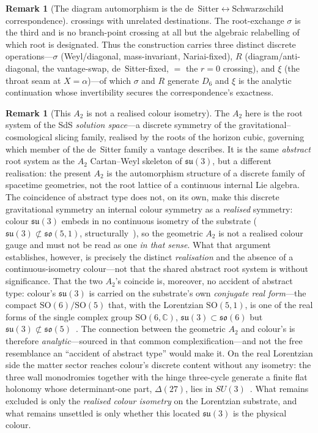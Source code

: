 \documentclass[11pt,a4paper]{article}
\theoremstyle{definition}
\newtheorem{remark}[theorem]{Remark}
\begin{document}
\begin{remark}[The diagram automorphism is the de~Sitter$\leftrightarrow$Schwarzschild correspondence]
crossings with unrelated destinations. The root-exchange $\sigma$ is the third and is no branch-point crossing at all but the algebraic relabelling of which root is designated. Thus the construction carries three distinct discrete operations---$\sigma$ (Weyl/diagonal, mass-invariant, Nariai-fixed), $R$ (diagram/anti-diagonal, the vantage-swap, de~Sitter-fixed, $=$ the $r=0$ crossing), and $\xi$ (the throat seam at $X=\alpha$)---of which $\sigma$ and $R$ generate $D_{6}$ and $\xi$ is the analytic continuation whose invertibility secures the correspondence's exactness.
\end{remark}

\begin{remark}[This $A_{2}$ is not a realised colour isometry]\label{rem:a2-distinct}
The $A_{2}$ here is the root system of the SdS \emph{solution space}---a discrete symmetry of the gravitational--cosmological slicing family, realised by the roots of the horizon cubic, governing which member of the de~Sitter family a vantage describes. It is the same \emph{abstract} root system as the $A_{2}$ Cartan--Weyl skeleton of $\mathfrak{su}(3)$, but a different realisation: the present $A_{2}$ is the automorphism structure of a discrete family of spacetime geometries, not the root lattice of a continuous internal Lie algebra. The coincidence of abstract type does not, on its own, make this discrete gravitational symmetry an internal colour symmetry as a \emph{realised} symmetry: colour $\mathfrak{su}(3)$ embeds in no continuous isometry of the substrate ($\mathfrak{su}(3)\not\subset\mathfrak{so}(5,1)$, structurally~\cite{JanzenBoundary}), so the geometric $A_{2}$ is not a realised colour gauge and must not be read as one \emph{in that sense}. What that argument establishes, however, is precisely the distinct \emph{realisation} and the absence of a continuous-isometry colour---not that the shared abstract root system is without significance. That the two $A_{2}$'s coincide is, moreover, no accident of abstract type: colour's $\mathfrak{su}(3)$ is carried on the substrate's own \emph{conjugate real form}---the compact $\mathrm{SO}(6)/\mathrm{SO}(5)$ that, with the Lorentzian $\mathrm{SO}(5,1)$, is one of the real forms of the single complex group $\mathrm{SO}(6,\mathbb{C})$, $\mathfrak{su}(3)\subset\mathfrak{so}(6)$ but $\mathfrak{su}(3)\not\subset\mathfrak{so}(5)$~\cite{JanzenBoundary,JanzenGeometricCore}. The connection between the geometric $A_{2}$ and colour's is therefore \emph{analytic}---sourced in that common complexification---and not the free resemblance an ``accident of abstract type'' would make it. On the real Lorentzian side the matter sector reaches colour's discrete content without any isometry: the
three wall monodromies together with the hinge three-cycle generate a finite flat holonomy whose
determinant-one part, $\Delta(27)$, lies in $SU(3)$~\cite{JanzenMatter}. What remains excluded is only the
\emph{realised colour isometry} on the Lorentzian substrate, and what remains unsettled is only whether this
located $\mathfrak{su}(3)$ is the physical colour.
\end{remark}
\end{document}
